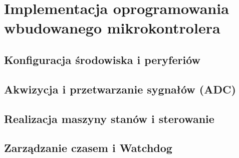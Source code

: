 \chapter{Implementacja oprogramowania wbudowanego mikrokontrolera}
\label{chap:firmware}

\section{Konfiguracja środowiska i peryferiów}

\section{Akwizycja i przetwarzanie sygnałów (ADC)}

\section{Realizacja maszyny stanów i sterowanie}

\section{Zarządzanie czasem i Watchdog}
